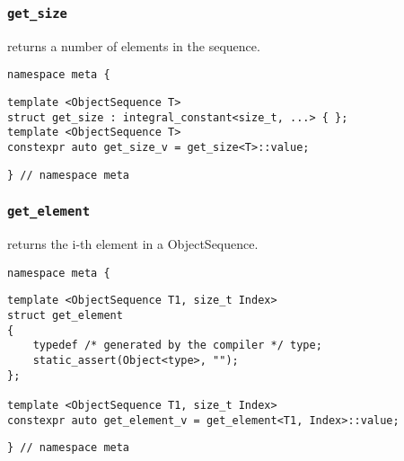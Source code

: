 
\subsubsection{\texttt{get\_size}}

returns a number of elements in the sequence.

\begin{verbatim}
namespace meta {
\end{verbatim}
\begin{verbatim}
template <ObjectSequence T>
struct get_size : integral_constant<size_t, ...> { };
template <ObjectSequence T>
constexpr auto get_size_v = get_size<T>::value;
\end{verbatim}
\begin{verbatim}
} // namespace meta
\end{verbatim}

\subsubsection{\texttt{get\_element}}

returns the i-th element in a ObjectSequence.

\begin{verbatim}
namespace meta {
\end{verbatim}
\begin{verbatim}
template <ObjectSequence T1, size_t Index>
struct get_element
{
	typedef /* generated by the compiler */ type;
	static_assert(Object<type>, "");
};
	
template <ObjectSequence T1, size_t Index>
constexpr auto get_element_v = get_element<T1, Index>::value;
\end{verbatim}
\begin{verbatim}
} // namespace meta
\end{verbatim}
